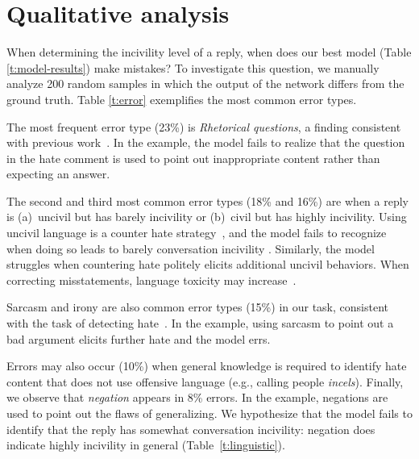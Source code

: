 \documentclass[11pt]{article}
\begin{document}
	
	\section{Qualitative analysis}
	\label{s:erroranalysis}
	
	When determining the incivility level of a reply,
	when does our best model (Table \ref{t:model-results}) make mistakes? 
	To investigate this question,
	we manually analyze 200 random samples in which the output of the network differs from the ground truth. 
	Table \ref{t:error} exemplifies the most common error types.
	
	The most frequent error type (23\%) is \emph{Rhetorical questions},
	a finding consistent with previous work~\cite{schmidt-wiegand-2017-survey}. 
	In the example,
	the model fails to realize that the question in the hate comment is used to point out inappropriate content rather than expecting an answer.
	
	The second and third most common error types (18\% and 16\%)
	are when a reply is
	(a)~uncivil but has barely incivility
	or
	(b)~civil but has highly incivility.
	Using uncivil language is a counter hate strategy~\cite{DBLP:conf/icwsm/MathewSTRSMG019},
	and the model fails to recognize when doing so leads to barely conversation incivility .
	Similarly, the model struggles when countering hate politely elicits additional uncivil behaviors.
	When correcting misstatements, language toxicity may increase~\cite{10.1145/3411764.3445642}.
	
	
	Sarcasm and irony are also common error types (15\%) in our task,
	consistent with the task of detecting hate~\cite{nobata2016abusive,qian-etal-2019-benchmark}.
	In the example, using sarcasm to point out a bad argument elicits further hate and the model errs.
	
	Errors may also occur (10\%) when general knowledge is required to identify hate content that does not use offensive language (e.g., calling people \emph{incels}).
	Finally, we observe that \emph{negation} appears in 8\% errors.
	In the example, negations are used to point out the flaws of generalizing.
	We hypothesize that the model fails to identify that the reply has somewhat conversation incivility: negation does indicate highly incivility in general (Table~\ref{t:linguistic}).
	
	
\end{document}
